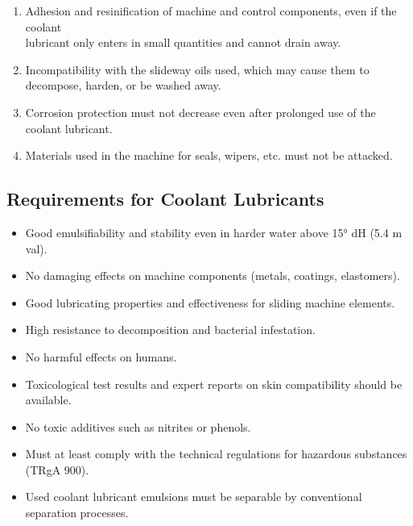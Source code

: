 \begin{enumerate}
    \item Adhesion and resinification of machine and control components, even if the coolant \\lubricant only enters in small quantities and cannot drain away.
    \item Incompatibility with the slideway oils used, which may cause them to decompose, harden, or be washed away.
    \item Corrosion protection must not decrease even after prolonged use of the coolant lubricant.
    \item Materials used in the machine for seals, wipers, etc. must not be attacked.
\end{enumerate}

\subsection*{Requirements for Coolant Lubricants\footnotemark[2]}

\begin{itemize}
    \item Good emulsifiability and stability even in harder water above 15° dH (5.4 m val).
    \item No damaging effects on machine components (metals, coatings, elastomers).
    \item Good lubricating properties and effectiveness for sliding machine elements.
    \item High resistance to decomposition and bacterial infestation.
    \item No harmful effects on humans.
    \item Toxicological test results and expert reports on skin compatibility should be available.
    \item No toxic additives such as nitrites or phenols.
    \item Must at least comply with the technical regulations for hazardous substances (TRgA 900).
    \item Used coolant lubricant emulsions must be separable by conventional separation processes.
\end{itemize}


